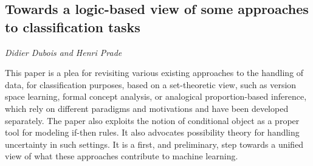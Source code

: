 \documentclass[../booklet.tex]{subfiles}
\begin{document}
\subsection[Towards a logic-based view of some approaches to classification tasks. {\it Didier Dubois and Henri Prade}]{Towards a logic-based view of some approaches to classification tasks}
 

\begin{center}
  {\it Didier Dubois and Henri Prade}
\end{center}



This  paper is a plea for revisiting various existing approaches to the handling of data, for classification purposes, based on a set-theoretic view, such as version space learning, formal concept analysis, or analogical proportion-based inference, which rely on different paradigms and motivations and have been developed separately. The paper also exploits the notion of conditional object as a proper tool for 
modeling if-then rules. It also advocates possibility theory for handling uncertainty in such settings. 
It is a first, and preliminary, step towards a unified view of what these approaches contribute to machine learning. \\

\end{document}
